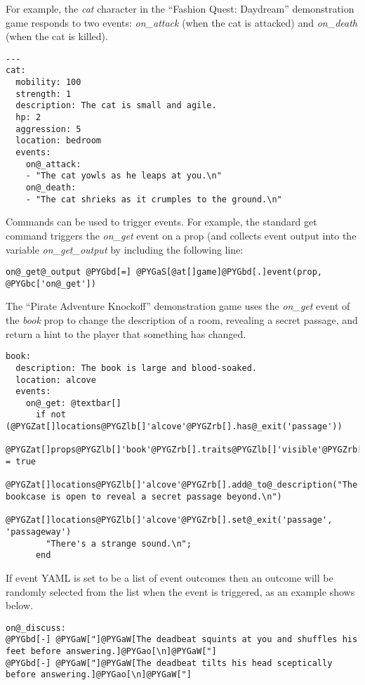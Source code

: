 \documentclass[letterpaper,10pt,english]{manual}
\begin{document}
For example, the \emph{cat} character in the ``Fashion Quest: Daydream'' demonstration game responds to two events: \emph{on\_attack} (when the cat is attacked) and \emph{on\_death} (when the cat is killed).

\begin{Verbatim}[commandchars=@\[\]]
--- 
cat: 
  mobility: 100
  strength: 1
  description: The cat is small and agile.
  hp: 2
  aggression: 5
  location: bedroom
  events:
    on@_attack:
    - "The cat yowls as he leaps at you.\n"
    on@_death:
    - "The cat shrieks as it crumples to the ground.\n"
\end{Verbatim}

Commands can be used to trigger events. For example, the standard get command triggers the \emph{on\_get} event on a prop (and collects event output into the variable \emph{on\_get\_output} by including the following line:

\begin{Verbatim}[commandchars=@\[\]]
on@_get@_output @PYGbd[=] @PYGaS[@at[]game]@PYGbd[.]event(prop, @PYGbc['on@_get'])
\end{Verbatim}

The ``Pirate Adventure Knockoff'' demonstration game uses the \emph{on\_get} event of the \emph{book} prop to change the description of a room, revealing a secret passage, and return a hint to the player that something has changed.

\begin{Verbatim}[commandchars=@\[\]]
book:
  description: The book is large and blood-soaked.
  location: alcove
  events:
    on@_get: @textbar[]
      if not (@PYGZat[]locations@PYGZlb[]'alcove'@PYGZrb[].has@_exit('passage'))
        @PYGZat[]props@PYGZlb[]'book'@PYGZrb[].traits@PYGZlb[]'visible'@PYGZrb[] = true
        @PYGZat[]locations@PYGZlb[]'alcove'@PYGZrb[].add@_to@_description("The bookcase is open to reveal a secret passage beyond.\n")
        @PYGZat[]locations@PYGZlb[]'alcove'@PYGZrb[].set@_exit('passage', 'passageway')
        "There's a strange sound.\n";
      end
\end{Verbatim}

If event YAML is set to be a list of event outcomes then an outcome will be randomly selected from the list when the event is triggered, as an example shows below.

\begin{Verbatim}[commandchars=@\[\]]
on@_discuss:
@PYGbd[-] @PYGaW["]@PYGaW[The deadbeat squints at you and shuffles his feet before answering.]@PYGao[\n]@PYGaW["]
@PYGbd[-] @PYGaW["]@PYGaW[The deadbeat tilts his head sceptically before answering.]@PYGao[\n]@PYGaW["]
\end{Verbatim}
\end{document}
